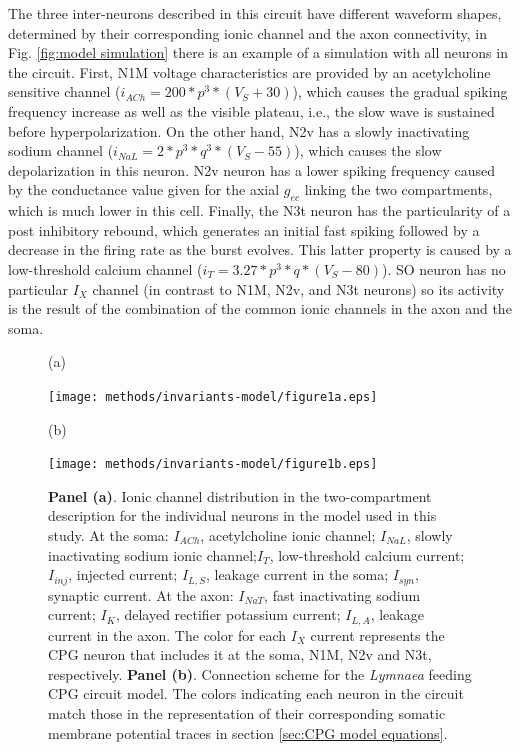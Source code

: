 The three inter-neurons described in this circuit have different waveform shapes, determined by their corresponding ionic channel and the axon connectivity, in Fig. \ref{fig:model simulation} there is an example of a simulation with all neurons in the circuit. First, N1M voltage characteristics are provided by an acetylcholine sensitive channel (\(i_{ACh} = 200 * p^3 * (V_S + 30)\)), which causes the gradual spiking frequency increase as well as the visible plateau, i.e., the slow wave is sustained before hyperpolarization. On the other hand, N2v has a slowly inactivating sodium channel (\(i_{NaL} = 2 * p^3 * q^3 * (V_S-55)\)), which causes the slow depolarization in this neuron. N2v neuron has a lower spiking frequency caused by the conductance value given for the axial $g_{ec}$ linking the two compartments, which is much lower in this cell. Finally, the N3t neuron has the particularity of a post inhibitory rebound, which generates an initial fast spiking followed by a decrease in the firing rate as the burst evolves. This latter property is caused by a low-threshold calcium channel (\( i_T = 3.27 * p^3 * q *(V_S-80)\)). SO neuron has no particular  \(I_X\) channel (in contrast to N1M, N2v, and N3t neurons) so its activity is the result of the combination of the common ionic channels in the axon and the soma.


\begin{figure}[htb!]
	\centering
	\begin{minipage}[t]{0.45\textwidth}
		\raggedright
		(a) \par
		\vspace{65pt}
		\centering
		\texttt{[image: methods/invariants-model/figure1a.eps]}
	\end{minipage}\hfill
	\begin{minipage}[t]{0.35\textwidth}
		\raggedright
		(b) \par
		\centering
		\texttt{[image: methods/invariants-model/figure1b.eps]}
	\end{minipage}
	\caption{\textbf{Panel (a)}. Ionic channel distribution in the two-compartment description for the individual neurons in the \textcite{vavoulis_dynamic_2007} model used in this study. At the soma: $I_{ACh}$, acetylcholine ionic channel; $I_{NaL}$, slowly inactivating sodium
		ionic channel;$I_T$, low-threshold calcium current; $I_{inj}$, injected current; $I_{L,S}$, leakage current in the soma; $I_{syn}$, synaptic current. At the axon: $I_{NaT}$, fast inactivating sodium current; $I_K$, delayed rectifier potassium current; $I_{L,A}$, leakage current in the axon. The color for each $I_X$ current represents the CPG neuron that includes it at the soma,  N1M, N2v and N3t, respectively. \textbf{Panel (b)}. Connection scheme for the {\sl Lymnaea} feeding CPG circuit model. The colors indicating each neuron in the circuit match those in the representation of their corresponding somatic membrane potential traces in section \ref{sec:CPG model equations}. 
	}
	\label{fig:CPG diagram 2 compartments}
\end{figure}

